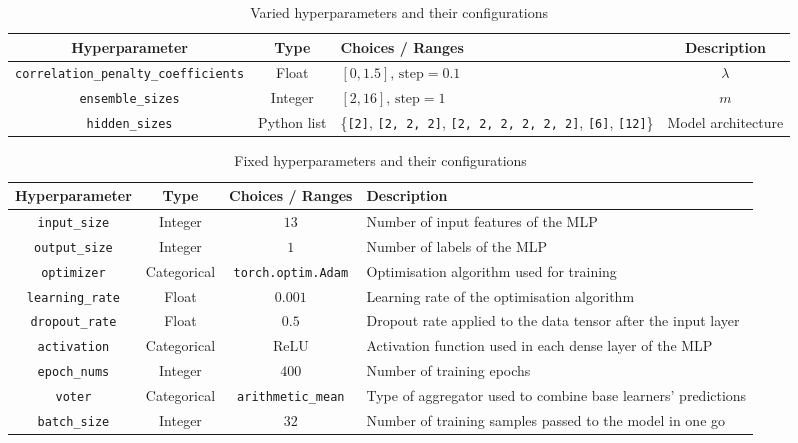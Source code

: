 \begin{table}[H]
    \centering
    \begin{tabular}{|c|c|p{4cm}|c|}
        \hline
        Hyperparameter & Type & Choices / Ranges & Description \\
        \hline
        \small\texttt{correlation\_penalty\_coefficients} & Float & $[0, 1.5]\text{, step}=0.1$ & $\lambda$ \\
        \hline
        \small\texttt{ensemble\_sizes} & Integer & $[2, 16]\text{, step}=1$ & $m$ \\
        \hline
        \small\texttt{hidden\_sizes} & Python list & \{\texttt{[2]}, \texttt{[2, 2, 2]}, \texttt{[2, 2, 2, 2, 2, 2]}, \texttt{[6]}, \texttt{[12]}\} & Model architecture \\
        \hline
    \end{tabular}
    \caption{Varied hyperparameters and their configurations}
    \label{table:experiment_3_varied_hyperparameters}
\end{table}

\begin{table}[H]
    \centering
    \begin{tabular}{|c|c|c|p{5cm}|}
        \hline
        Hyperparameter & Type & Choices / Ranges & Description \\
        \hline
        \small\texttt{input\_size} & Integer & $13$ & Number of input features of the MLP \\
        \hline
        \small\texttt{output\_size} & Integer & $1$ & Number of labels of the MLP \\
        \hline
        \small\texttt{optimizer} & Categorical & \texttt{torch.optim.Adam} & Optimisation algorithm used for training \\
        \hline
        \small\texttt{learning\_rate} & Float & $0.001$ & Learning rate of the optimisation algorithm \\
        \hline
        \small\texttt{dropout\_rate} & Float & $0.5$ & Dropout rate applied to the data tensor after the input layer \\
        \hline
        \small\texttt{activation} & Categorical & ReLU & Activation function used in each dense layer of the MLP \\
        \hline
        \small\texttt{epoch\_nums} & Integer & $400$ & Number of training epochs \\
        \hline
        \small\texttt{voter} & Categorical & \texttt{arithmetic\_mean} & Type of aggregator used to combine base learners' predictions \\
        \hline
        \small\texttt{batch\_size} & Integer & $32$ & Number of training samples passed to the model in one go \\
        \hline
    \end{tabular}
    \caption{Fixed hyperparameters and their configurations}
    \label{table:experiment_3_fixed_hyperparameters}
\end{table}


